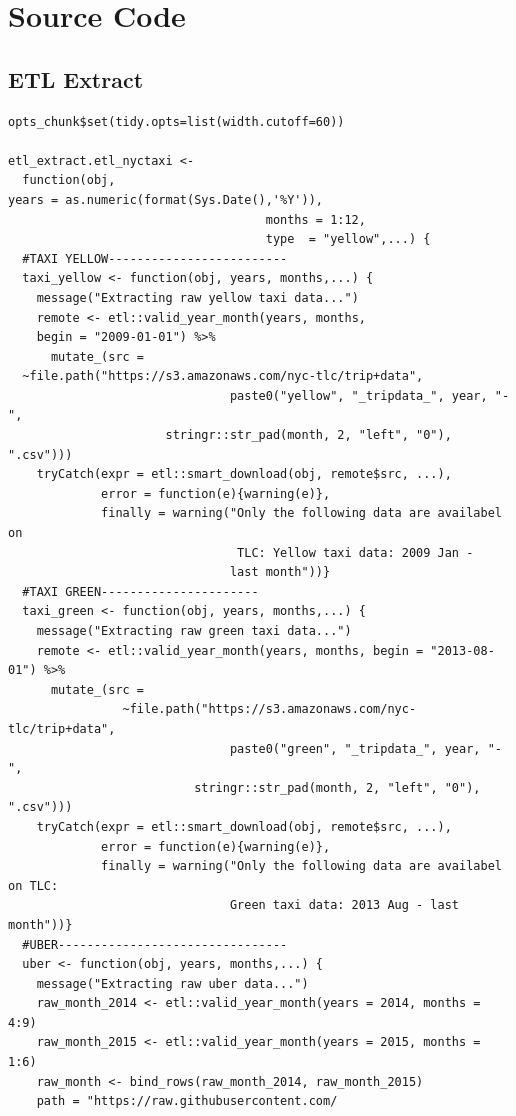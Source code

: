 \documentclass[12pt,twoside]{reedthesis}
\theoremstyle{definition}
\theoremstyle{definition}
\theoremstyle{definition}
\theoremstyle{remark}
\begin{document}
\section{Source Code}\label{source-code}

\subsection{ETL Extract}\label{etl-extract}
\begin{verbatim}
opts_chunk$set(tidy.opts=list(width.cutoff=60))

etl_extract.etl_nyctaxi <- 
  function(obj, 
years = as.numeric(format(Sys.Date(),'%Y')), 
                                    months = 1:12, 
                                    type  = "yellow",...) {
  #TAXI YELLOW-------------------------
  taxi_yellow <- function(obj, years, months,...) {
    message("Extracting raw yellow taxi data...")
    remote <- etl::valid_year_month(years, months, 
    begin = "2009-01-01") %>%
      mutate_(src = 
  ~file.path("https://s3.amazonaws.com/nyc-tlc/trip+data", 
                               paste0("yellow", "_tripdata_", year, "-",
                      stringr::str_pad(month, 2, "left", "0"), ".csv"))) 
    tryCatch(expr = etl::smart_download(obj, remote$src, ...),
             error = function(e){warning(e)}, 
             finally = warning("Only the following data are availabel on
                                TLC: Yellow taxi data: 2009 Jan - 
                               last month"))} 
  #TAXI GREEN----------------------
  taxi_green <- function(obj, years, months,...) {
    message("Extracting raw green taxi data...")
    remote <- etl::valid_year_month(years, months, begin = "2013-08-01") %>%
      mutate_(src = 
                ~file.path("https://s3.amazonaws.com/nyc-tlc/trip+data", 
                               paste0("green", "_tripdata_", year, "-",
                          stringr::str_pad(month, 2, "left", "0"), ".csv")))
    tryCatch(expr = etl::smart_download(obj, remote$src, ...),
             error = function(e){warning(e)}, 
             finally = warning("Only the following data are availabel on TLC:
                               Green taxi data: 2013 Aug - last month"))} 
  #UBER--------------------------------
  uber <- function(obj, years, months,...) {
    message("Extracting raw uber data...")
    raw_month_2014 <- etl::valid_year_month(years = 2014, months = 4:9)
    raw_month_2015 <- etl::valid_year_month(years = 2015, months = 1:6)
    raw_month <- bind_rows(raw_month_2014, raw_month_2015)
    path = "https://raw.githubusercontent.com/

\end{verbatim}
\end{document}
